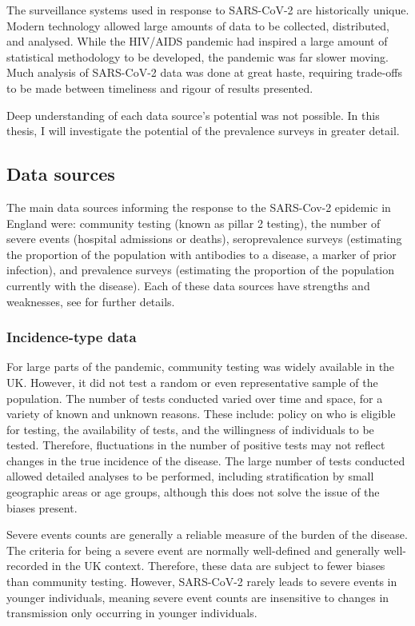\documentclass[thesis.tex]{subfiles}
\begin{document}
The surveillance systems used in response to SARS-CoV-2 are historically unique.
Modern technology allowed large amounts of data to be collected, distributed, and analysed.
While the HIV/AIDS pandemic had inspired a large amount of statistical methodology to be developed, the pandemic was far slower moving.
Much analysis of SARS-CoV-2 data was done at great haste, requiring trade-offs to be made between timeliness and rigour of results presented.

Deep understanding of each data source's potential was not possible.
In this thesis, I will investigate the potential of the prevalence surveys in greater detail.

\subsection{Data sources} \label{intro:sec:data-for-estimating}

The main data sources informing the response to the SARS-Cov-2 epidemic in England were: community testing (known as pillar 2 testing), the number of severe events (\eg hospital admissions or deaths), seroprevalence surveys (estimating the proportion of the population with antibodies to a disease, a marker of prior infection), and prevalence surveys (estimating the proportion of the population currently with the disease).
Each of these data sources have strengths and weaknesses, see \textcite{royalSocietyRnumber} for further details.

\subsubsection{Incidence-type data}

For large parts of the pandemic, community testing was widely available in the UK.
However, it did not test a random or even representative sample of the population.
The number of tests conducted varied over time and space, for a variety of known and unknown reasons.
These include: policy on who is eligible for testing, the availability of tests, and the willingness of individuals to be tested.
Therefore, fluctuations in the number of positive tests may not reflect changes in the true incidence of the disease.
The large number of tests conducted allowed detailed analyses to be performed, including stratification by small geographic areas or age groups, although this does not solve the issue of the biases present.

Severe events counts are generally a reliable measure of the burden of the disease.
The criteria for being a severe event are normally well-defined and generally well-recorded in the UK context.
Therefore, these data are subject to fewer biases than community testing.
However, SARS-CoV-2 rarely leads to severe events in younger individuals, meaning severe event counts are insensitive to changes in transmission only occurring in younger individuals.
\end{document}
